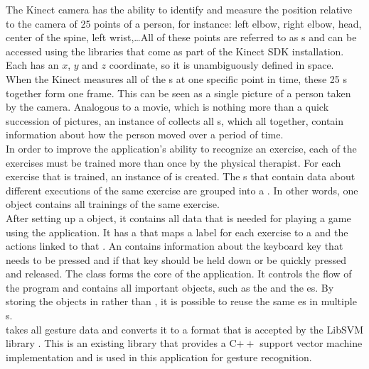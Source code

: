 The Kinect camera has the ability to identify and measure the position relative to the camera of 25 points of a person, for instance: left elbow, right elbow, head, center of the spine, left wrist,\ldots All of these points are referred to as s and can be accessed using the libraries that come as part of the Kinect SDK installation. Each  has an $x$, $y$ and $z$ coordinate, so it is unambiguously defined in space.\\

When the Kinect measures all of the s at one specific point in time, these 25 s together form one frame. This can be seen as a single picture of a person taken by the camera. Analogous to a movie, which is nothing more than a quick succession of pictures, an instance of  collects all s, which all together, contain information about how the person moved over a period of time.\\

In order to improve the application's ability to recognize an exercise, each of the exercises must be trained more than once by the physical therapist. For each exercise that is trained, an instance of  is created. The s that contain data about different executions of the same exercise are grouped into a . In other words, one  object contains all trainings of the same exercise.\\

After setting up a  object, it contains all data that is needed for playing a game using the application. It has a  that maps a label for each exercise to a  and the actions linked to that . An  contains information about the keyboard key that needs to be pressed and if that key should be held down or be quickly pressed and released. The  class forms the core of the application. It controls the flow of the program and contains all important objects, such as the  and the es. By storing the  objects in  rather than , it is possible to reuse the same es in multiple s.\\

 takes all gesture data and converts it to a format that is accepted by the LibSVM library \cite{LibSVM}. This is an existing library that provides a C$++$ support vector machine implementation and is used in this application for gesture recognition.\\


